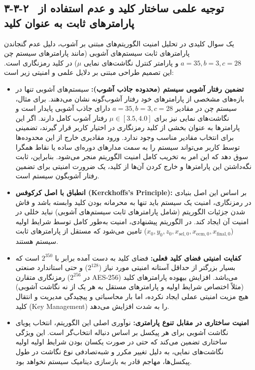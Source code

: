 \subsection{۳-۳-۲  توجیه علمی ساختار کلید و عدم استفاده از پارامترهای ثابت به عنوان کلید}
یک سوال کلیدی در تحلیل امنیت الگوریتم‌های مبتنی بر آشوب، دلیل عدم گنجاندن پارامترهای ثابت سیستم‌های آشوبی (مانند پارامترهای سیستم چن $a=35, b=3, c=28$ و پارامتر کنترل نگاشت‌های نمایی $\mu$) در کلید رمزنگاری است. این تصمیم طراحی مبتنی بر دلایل علمی و امنیتی زیر است:
\begin{itemize}
    \item \textbf{تضمین رفتار آشوبی سیستم (محدوده جاذب آشوب):} سیستم‌های آشوبی تنها در بازه‌های مشخصی از پارامترهای خود رفتار آشوب‌گونه نشان می‌دهند. برای مثال، سیستم چن در مقادیر $a=35, b=3, c=28$ دارای جاذب آشوبی پایدار است و نگاشت‌های نمایی نیز برای $\mu \in [3.5, 4.0]$ رفتار آشوب کامل دارند. اگر این پارامترها به عنوان بخشی از کلید رمزنگاری در اختیار کاربر قرار گیرند، تضمینی برای انتخاب مقادیر مناسب وجود ندارد. ورود مقادیری خارج از این محدوده‌ها توسط کاربر می‌تواند سیستم را به سمت مدارهای دوره‌ای ساده یا نقاط همگرا سوق دهد که این امر به تخریب کامل امنیت الگوریتم منجر می‌شود. بنابراین، ثابت نگه‌داشتن این پارامترها و خارج کردن آن‌ها از کلید، یک ضرورت امنیتی برای تضمین رفتار آشوبگون سیستم است.
    \item \textbf{انطباق با اصل کرکوفس (‎Kerckhoffs's Principle‎):} بر اساس این اصل بنیادی در رمزنگاری، امنیت یک سیستم باید تنها به محرمانه بودن کلید وابسته باشد و فاش شدن جزئیات الگوریتم (شامل پارامترهای ثابت سیستم‌های آشوبی) نباید خللی در امنیت آن ایجاد کند. در الگوریتم پیشنهادی، امنیت به‌طور کامل توسط شرایط اولیه ($x_0, y_0, z_0, x_{\mathrm{sel},0}, x_{\mathrm{ecm},0}, x_{\mathrm{final},0}$) تامین می‌شود که مستقل از پارامترهای ثابت سیستم هستند.
    \item \textbf{کفایت امنیتی فضای کلید فعلی:} فضای کلید به دست آمده برابر با $2^{350}$ است که بسیار بزرگتر از حداقل آستانه امنیتی مورد نیاز ($2^{128}$) و حتی استاندارد صنعتی رمزنگاری متقارن ($2^{256}$ در ‎AES-256‎) می‌باشد. افزایش بیهوده پارامترهای کلید (مثلاً اختصاص شرایط اولیه و پارامترهای مستقل به هر یک از نه نگاشت آشوبی) هیچ مزیت امنیتی عملی ایجاد نکرده، اما بار محاسباتی و پیچیدگی مدیریت و انتقال کلید (‎Key Management‎) را به شدت افزایش می‌دهد.
    \item \textbf{امنیت ساختاری در مقابل تنوع پارامتری:} نوآوری اصلی این الگوریتم، انتخاب پویای نگاشت آشوبی برای هر پیکسل بر اساس دنباله انتخاب‌گر است. این ویژگی ساختاری تضمین می‌کند که حتی در صورت یکسان بودن شرایط اولیه اولیه نگاشت‌های نمایی، به دلیل تغییر مکرر و شبه‌تصادفی نوع نگاشت در طول پیکسل‌ها، مهاجم قادر به بازسازی دینامیک سیستم نخواهد بود.
\end{itemize}


